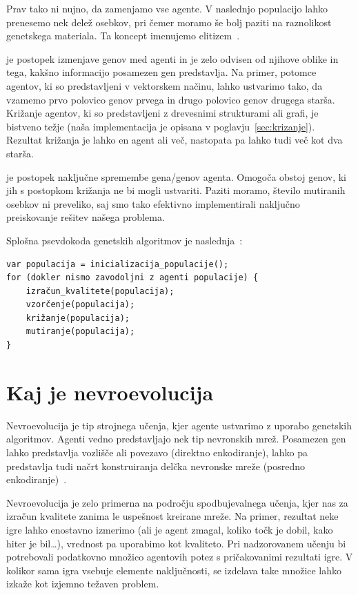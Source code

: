 \documentclass[a4paper,12pt,openright]{book}
\begin{document}
\begin{description}
{            Prav tako ni nujno, da zamenjamo vse agente. V naslednjo populacijo lahko prenesemo nek delež osebkov, pri
            čemer moramo še bolj paziti na raznolikost genetskega materiala. Ta koncept imenujemo elitizem~\cite{inteligentni_sistemi_2010}.
            \item}
        \item[Križanje]{je postopek izmenjave genov med agenti in je zelo odvisen od njihove oblike in tega, kakšno informacijo posamezen gen predstavlja. Na primer, potomce agentov,
            ki so predstavljeni v vektorskem načinu, lahko ustvarimo tako, da vzamemo prvo polovico genov prvega in drugo polovico genov
            drugega starša. Križanje agentov, ki so predstavljeni z drevesnimi strukturami ali grafi, je bistveno težje
            (naša implementacija je opisana v poglavju~\ref{sec:krizanje}).
            Rezultat križanja je lahko en agent ali več, nastopata pa lahko tudi več kot dva starša. }
        \item[Mutiranje]{je postopek naključne spremembe gena/genov agenta. Omogoča obstoj genov, ki jih
            s postopkom križanja ne bi mogli ustvariti. Paziti moramo, število mutiranih osebkov ni preveliko, saj
            smo tako efektivno implementirali naključno preiskovanje rešitev našega problema.}
    \end{description}

    Splošna psevdokoda genetskih algoritmov je naslednja~\cite{inteligentni_sistemi_2010}:
    \begin{verbatim}
var populacija = inicializacija_populacije();
for (dokler nismo zavodoljni z agenti populacije) {
    izračun_kvalitete(populacija);
    vzorčenje(populacija);
    križanje(populacija);
    mutiranje(populacija);
}
    \end{verbatim}


    \section{Kaj je nevroevolucija}\label{sec:kaj-je-nevroevolucija}
    Nevroevolucija je tip strojnega učenja, kjer agente ustvarimo z uporabo genetskih algoritmov.
    Agenti vedno predstavljajo nek tip nevronskih mrež.
    Posamezen gen lahko predstavlja vozlišče ali povezavo (direktno enkodiranje), lahko pa
    predstavlja tudi načrt konstruiranja delčka nevronske mreže (posredno enkodiranje)~\cite{kassahun2007common}.

    Nevroevolucija je zelo primerna na področju spodbujevalnega učenja, kjer nas za izračun kvalitete zanima le uspešnost
    kreirane mreže.
    Na primer, rezultat neke igre lahko enostavno izmerimo (ali je agent zmagal, koliko točk je dobil, kako hiter je bil\ldots),
    vrednost pa uporabimo kot kvaliteto.
    Pri nadzorovanem učenju bi potrebovali podatkovno množico agentovih potez s pričakovanimi rezultati igre.
    V kolikor sama igra vsebuje elemente naključnosti, se izdelava take množice lahko izkaže kot izjemno težaven problem.
\end{document}

